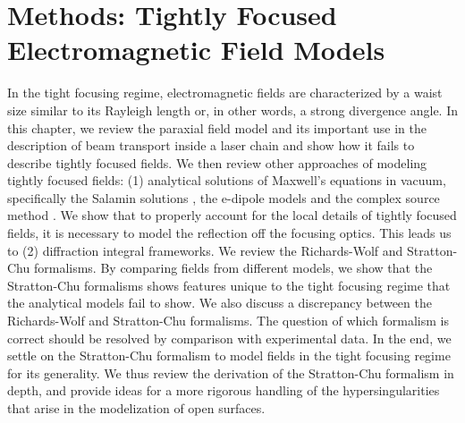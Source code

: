 \documentclass[11pt,SymmetricalJury]{inrsthesis/inrsthesis}
\begin{document}

\chapter{Methods: Tightly Focused Electromagnetic Field Models}
\label{chapter:methods}

In the tight focusing regime, electromagnetic fields are characterized
by a waist size similar to its Rayleigh length or, in other words, a strong
divergence angle. In this chapter, we review the paraxial field model and its
important use in the description of beam transport inside a laser chain and show
how it fails to describe tightly focused fields. We then review other approaches
of modeling tightly focused fields: (1) analytical solutions of Maxwell's equations
in vacuum, specifically the Salamin solutions \cite{Salamin2015a,Salamin2015b},
the e-dipole models \cite{Gonoskov2012} and the complex source method \cite{April2012}.
We show that to properly account for the local details of tightly focused fields,
it is necessary to model the reflection off the focusing optics. This leads us to
(2) diffraction integral frameworks. We review the Richards-Wolf and Stratton-Chu
formalisms. By comparing fields from different models, we show that the Stratton-Chu
formalisms shows features unique to the tight focusing regime that the analytical
models fail to show. We also discuss a discrepancy between the Richards-Wolf and
Stratton-Chu formalisms. The question of which formalism is correct should be
resolved by comparison with experimental data. In the end, we settle on the
Stratton-Chu formalism to model fields in the tight focusing regime for its
generality.
We thus review the derivation of the Stratton-Chu formalism in depth, and provide
ideas for a more rigorous handling of the hypersingularities that arise in the
modelization of open surfaces.
\end{document}
